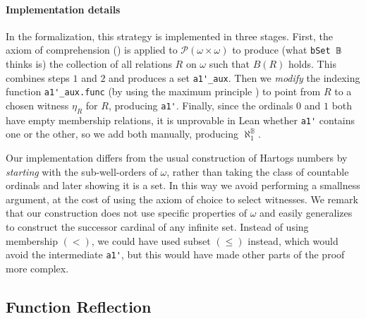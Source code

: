 \documentclass[sigplan,screen]{acmart}
\newcommand{\lil}{\lstinline}
\theoremstyle{definition}
\begin{document}
\paragraph{Implementation details}
In the formalization, this strategy is implemented in three stages.
First, the axiom of comprehension () is applied to \(\mathcal{P}(\omega \times \omega)\) to produce (what \lil{bSet 𝔹} thinks is) the collection of all relations \(R\) on \(\omega\) such that \(B(R)\) holds.
This combines steps \(1\) and \(2\) and produces a set \lil{a1'_aux}. Then we \emph{modify} the indexing function \lil{a1'_aux.func} (by using the maximum principle%
) to point from \(R\) to a chosen witness \(\eta_R\) for \(R\), producing \lil{a1'}.
Finally, since the ordinals \(0\) and \(1\) both have empty membership relations, it is unprovable in Lean whether \lil{a1'} contains one or the other, so we add both manually, producing \(\aleph_1^{\mathbb{B}}\).

Our implementation differs from the usual construction of Hartogs numbers by \emph{starting} with the sub-well-orders of \(\omega\), rather than taking the class of countable ordinals and later showing it is a set. In this way we avoid performing a smallness argument, at the cost of using the axiom of choice to select witnesses. We remark that our construction does not use specific properties of \(\omega\) and easily generalizes to construct the successor cardinal of any infinite set. Instead of using membership \((<)\), we could have used subset \((\leq)\) instead, which would avoid the intermediate \lil{a1'}, but this would have made other parts of the proof more complex.


\subsection{Function Reflection} \label{subsect:function-reflection}
\end{document}

